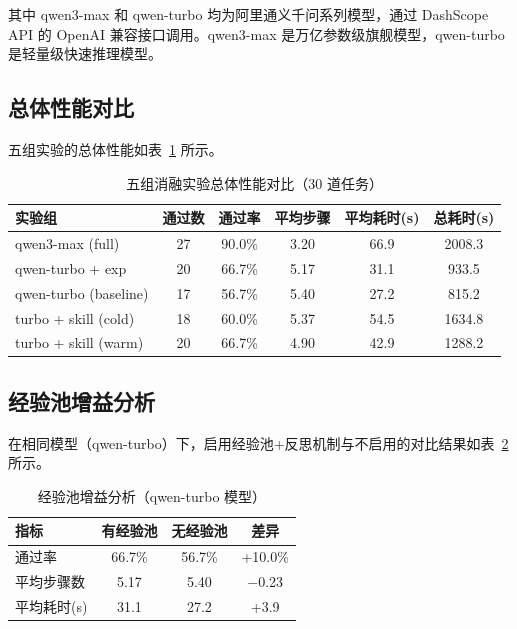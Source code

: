 其中 qwen3-max 和 qwen-turbo 均为阿里通义千问系列模型，通过 DashScope API 的 OpenAI 兼容接口调用。qwen3-max 是万亿参数级旗舰模型，qwen-turbo 是轻量级快速推理模型。

\subsection{总体性能对比}

五组实验的总体性能如表~\ref{tab:overall} 所示。

\begin{table}[htbp]
    \centering
    \caption{五组消融实验总体性能对比（30 道任务）}
    \label{tab:overall}
    \begin{tabular}{lccccc}
        \toprule
        实验组 & 通过数 & 通过率 & 平均步骤 & 平均耗时(s) & 总耗时(s) \\
        \midrule
        qwen3-max (full) & 27 & 90.0\% & 3.20 & 66.9 & 2008.3 \\
        qwen-turbo + exp & 20 & 66.7\% & 5.17 & 31.1 & 933.5 \\
        qwen-turbo (baseline) & 17 & 56.7\% & 5.40 & 27.2 & 815.2 \\
        turbo + skill (cold) & 18 & 60.0\% & 5.37 & 54.5 & 1634.8 \\
        turbo + skill (warm) & 20 & 66.7\% & 4.90 & 42.9 & 1288.2 \\
        \bottomrule
    \end{tabular}
\end{table}

\subsection{经验池增益分析}

在相同模型（qwen-turbo）下，启用经验池+反思机制与不启用的对比结果如表~\ref{tab:exp-gain} 所示。

\begin{table}[htbp]
    \centering
    \caption{经验池增益分析（qwen-turbo 模型）}
    \label{tab:exp-gain}
    \begin{tabular}{lccc}
        \toprule
        指标 & 有经验池 & 无经验池 & 差异 \\
        \midrule
        通过率 & 66.7\% & 56.7\% & +10.0\% \\
        平均步骤数 & 5.17 & 5.40 & $-$0.23 \\
        平均耗时(s) & 31.1 & 27.2 & +3.9 \\
        \bottomrule
    \end{tabular}
\end{table}

